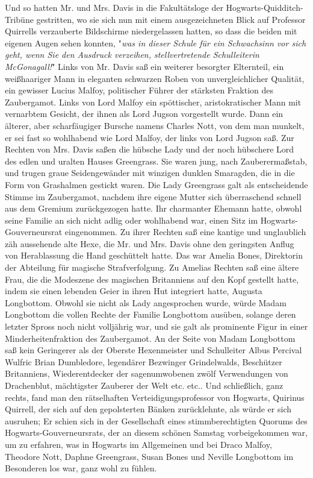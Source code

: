 {Und so hatten Mr. und Mrs. Davis in die Fakultätsloge der Hogwarts-Quidditch-Tribüne gestritten, wo sie sich nun mit einem ausgezeichneten Blick auf Professor Quirrells verzauberte Bildschirme niedergelassen hatten, so dass die beiden mit eigenen Augen sehen konnten, "\emph{was in dieser Schule für ein Schwachsinn vor sich geht, wenn Sie den Ausdruck verzeihen, stellvertretende Schulleiterin McGonagall!}" Links von Mr. Davis saß ein weiterer besorgter Elternteil, ein weißhaariger Mann in eleganten schwarzen Roben von unvergleichlicher Qualität, ein gewisser Lucius Malfoy, politischer Führer der stärksten Fraktion des Zaubergamot. Links von Lord Malfoy ein spöttischer, aristokratischer Mann mit vernarbtem Gesicht, der ihnen als Lord Jugson vorgestellt wurde. Dann ein älterer, aber scharfäugiger Bursche namens Charles Nott, von dem man munkelt, er sei fast so wohlhabend wie Lord Malfoy, der links von Lord Jugson saß. Zur Rechten von Mrs. Davis saßen die hübsche Lady und der noch hübschere Lord des edlen und uralten Hauses Greengrass. Sie waren jung, nach Zauberermaßstab, und trugen graue Seidengewänder mit winzigen dunklen Smaragden, die in die Form von Grashalmen gestickt waren. Die Lady Greengrass galt als entscheidende Stimme im Zaubergamot, nachdem ihre eigene Mutter sich überraschend schnell aus dem Gremium zurückgezogen hatte. Ihr charmanter Ehemann hatte, obwohl seine Familie an sich nicht adlig oder wohlhabend war, einen Sitz im Hogwarts-Gouverneursrat eingenommen. Zu ihrer Rechten saß eine kantige und unglaublich zäh aussehende alte Hexe, die Mr. und Mrs. Davis ohne den geringsten Anflug von Herablassung die Hand geschüttelt hatte. Das war Amelia Bones, Direktorin der Abteilung für magische Strafverfolgung. Zu Amelias Rechten saß eine ältere Frau, die die Modeszene des magischen Britanniens auf den Kopf gestellt hatte, indem sie einen lebenden Geier in ihren Hut integriert hatte, Augusta Longbottom. Obwohl sie nicht als Lady angesprochen wurde, würde Madam Longbottom die vollen Rechte der Familie Longbottom ausüben, solange deren letzter Spross noch nicht volljährig war, und sie galt als prominente Figur in einer Minderheitenfraktion des Zaubergamot. An der Seite von Madam Longbottom saß kein Geringerer als der Oberste Hexenmeister und Schulleiter Albus Percival Wulfric Brian Dumbledore, legendärer Bezwinger Grindelwalds, Beschützer Britanniens, Wiederentdecker der sagenumwobenen zwölf Verwendungen von Drachenblut, mächtigster Zauberer der Welt etc. etc.. Und schließlich, ganz rechts, fand man den rätselhaften Verteidigungsprofessor von Hogwarts, Quirinus Quirrell, der sich auf den gepolsterten Bänken zurücklehnte, als würde er sich ausruhen; Er schien sich in der Gesellschaft eines stimmberechtigten Quorums des Hogwarts-Gouverneursrats, der an diesem schönen Samstag vorbeigekommen war, um zu erfahren, was in Hogwarts im Allgemeinen und bei Draco Malfoy, Theodore Nott, Daphne Greengrass, Susan Bones und Neville Longbottom im Besonderen los war, ganz wohl zu fühlen.

}
